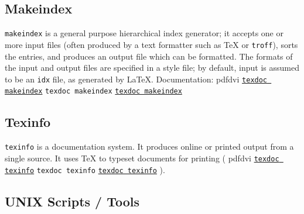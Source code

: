 \documentclass[11pt,a4paper]{article}
\newcommand{\pdfext}{pdf}
\newcommand{\dviext}{dvi}
\newcommand{\dlink}[3]{%
  \ifpdf
    \ifx\pdfext#3
      \href{#1/#2.#3}{\texttt{texdoc #2}}%
    \else
      \texttt{texdoc #2}%
    \fi
  \else
     \href{#1/#2.#3}{\mbox{\texttt{texdoc #2}}}%
  \fi}
\begin{document}
\subsection{Makeindex}
\texttt{makeindex} is a general purpose hierarchical index generator;
it accepts one or more input files (often produced by a text formatter
such as \TeX{} or \texttt{troff}), sorts the entries, and produces an
output file which can be formatted.  The formats of the input and
output files are specified in a style file; by default, input is
assumed to be an \texttt{idx} file, as generated by \LaTeX.
Documentation: \dlink{../../../texmf-dist/doc/makeindex}{makeindex}{\dviext}

\subsection{Texinfo}
\texttt{texinfo} is a documentation system. It produces online or
printed output from a single source. It uses \TeX{} to typeset
documents for printing (\dlink{../../../texmf-dist/doc/programs}{texinfo}{\dviext}).


\subsection{UNIX Scripts / Tools}
\end{document}
